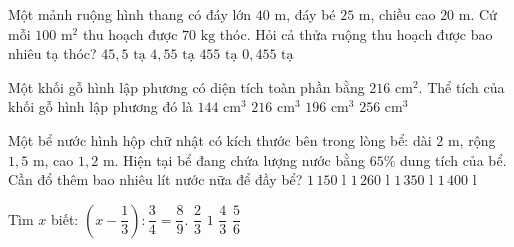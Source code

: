 \begin{ex} %
Một mảnh ruộng hình thang có đáy lớn $40\text{ m}$, đáy bé $25\text{ m}$, chiều cao $20\text{ m}$. Cứ mỗi $100\text{ m}^2$ thu hoạch được $70\text{ kg}$ thóc. Hỏi cả thửa ruộng thu hoạch được bao nhiêu tạ thóc?
\choice
{$45{,}5\text{ tạ}$}
{\True $4{,}55\text{ tạ}$}
{$455\text{ tạ}$}
{$0{,}455\text{ tạ}$}
\end{ex}

\begin{ex} %
Một khối gỗ hình lập phương có diện tích toàn phần bằng $216\text{ cm}^2$. Thể tích của khối gỗ hình lập phương đó là
\choice
{$144\text{ cm}^3$}
{\True $216\text{ cm}^3$}
{$196\text{ cm}^3$}
{$256\text{ cm}^3$}
\end{ex}

\begin{ex} %
Một bể nước hình hộp chữ nhật có kích thước bên trong lòng bể: dài $2\text{ m}$, rộng $1{,}5\text{ m}$, cao $1{,}2\text{ m}$. Hiện tại bể đang chứa lượng nước bằng $65\%$ dung tích của bể. Cần đổ thêm bao nhiêu lít nước nữa để đầy bể?
\choice
{$1\,150\text{ l}$}
{\True $1\,260\text{ l}$}
{$1\,350\text{ l}$}
{$1\,400\text{ l}$}
\end{ex}

\begin{ex} %
Tìm $x$ biết: $\left(x - \dfrac{1}{3}\right) : \dfrac{3}{4} = \dfrac{8}{9}$.
\choice
{$\dfrac{2}{3}$}
{\True $1$}
{$\dfrac{4}{3}$}
{$\dfrac{5}{6}$}
\end{ex}

